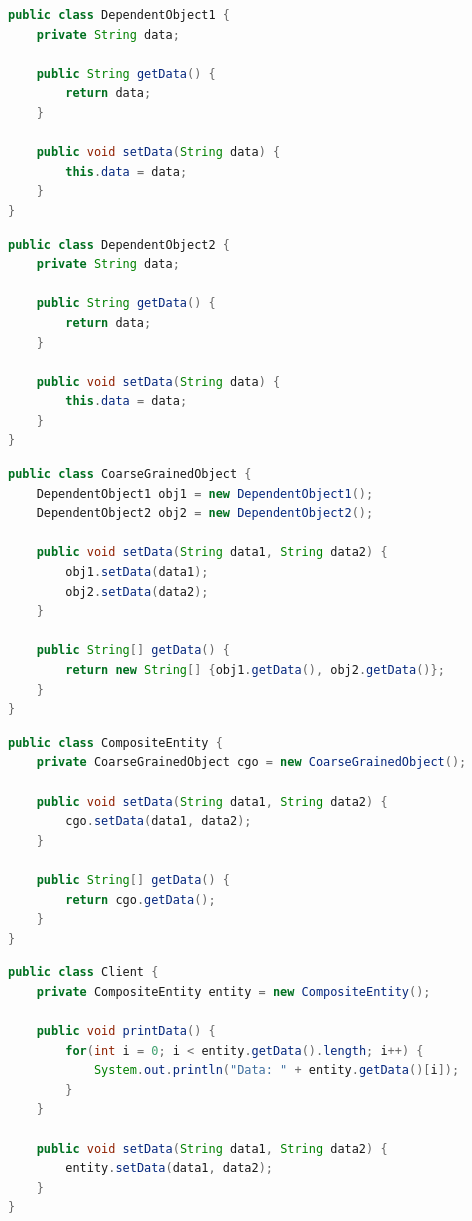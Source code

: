 \vspace{0.5cm}

\begin{lstlisting}[language=Java, title=DependentObject1.java]
public class DependentObject1 {
    private String data;

    public String getData() {
        return data;
    }

    public void setData(String data) {
        this.data = data;
    }
}
\end{lstlisting}

\begin{lstlisting}[language=Java, title=DependentObject2.java]
public class DependentObject2 {
    private String data;
    
    public String getData() {
        return data;
    }

    public void setData(String data) {
        this.data = data;
    }
}
\end{lstlisting}

\begin{lstlisting}[language=Java, title=CoarseGrainedObject.java]
public class CoarseGrainedObject {
    DependentObject1 obj1 = new DependentObject1();
    DependentObject2 obj2 = new DependentObject2();

    public void setData(String data1, String data2) {
        obj1.setData(data1);
        obj2.setData(data2);
    }

    public String[] getData() {
        return new String[] {obj1.getData(), obj2.getData()};
    }
}
\end{lstlisting}

\begin{lstlisting}[language=Java, title=CompositeEntity.java]
public class CompositeEntity {
    private CoarseGrainedObject cgo = new CoarseGrainedObject();

    public void setData(String data1, String data2) {
        cgo.setData(data1, data2);
    }

    public String[] getData() {
        return cgo.getData();
    }
}    
\end{lstlisting}

\begin{lstlisting}[language=Java, title=Client.java]
public class Client {
    private CompositeEntity entity = new CompositeEntity();

    public void printData() {
        for(int i = 0; i < entity.getData().length; i++) {
            System.out.println("Data: " + entity.getData()[i]);
        }
    }

    public void setData(String data1, String data2) {
        entity.setData(data1, data2);
    }
}    
\end{lstlisting}

